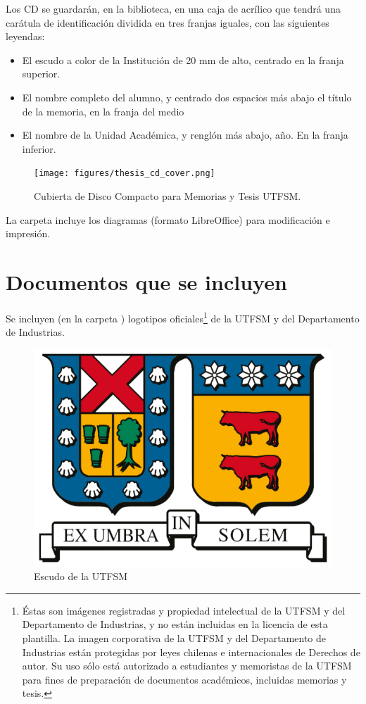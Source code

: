 Los CD se guardarán, en la biblioteca, en una caja de acrílico que tendrá una carátula de identificación dividida en tres franjas iguales, con las siguientes leyendas:
\begin{itemize}
		\item
    El escudo a color de la Institución de 20 mm de alto, centrado en la franja superior.
		\item
    El nombre completo del alumno, y centrado dos espacios más abajo el título de la memoria, en la franja del medio
		\item
    El nombre de la Unidad Académica, y renglón más abajo, año. En la franja inferior.
\end{itemize}


\begin{figure}[ht!]
    \centering
    \texttt{[image: figures/thesis\_cd\_cover.png]}
    \caption{Cubierta de Disco Compacto para Memorias y Tesis UTFSM.}
    \label{fig:thesis_cd_cover}
\end{figure}


La carpeta  incluye los diagramas (formato LibreOffice) para modificación e impresión.

\section{Documentos que se incluyen}

Se incluyen (en la carpeta ) logotipos oficiales\footnote{Éstas son imágenes registradas y propiedad intelectual de la UTFSM y del Departamento de Industrias, y no están incluidas en la licencia de esta plantilla. La imagen corporativa de la UTFSM y del Departamento de Industrias están protegidas por leyes chilenas e internacionales de Derechos de autor. Su uso sólo está autorizado a estudiantes y memoristas de la UTFSM para fines de preparación de documentos académicos, incluidas memorias y tesis.}
de la UTFSM y del Departamento de Industrias.

\begin{figure}[ht!]
\centering
\includegraphics[scale = .5]{figures/escudo-utfsm.png}
\caption{Escudo de la UTFSM}
\label{fig:escudo}
\end{figure}

